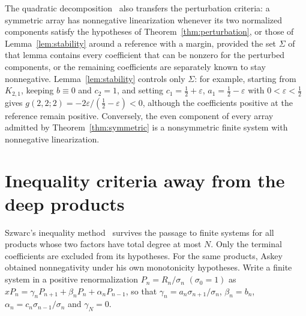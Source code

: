 The quadratic decomposition~\cite[Theorem~]{P1} also transfers the perturbation criteria: a symmetric array has nonnegative linearization whenever its two normalized components satisfy the hypotheses of Theorem~\ref{thm:perturbation}, or those of Lemma~\ref{lem:stability} around a reference with a margin, provided the set $\Sigma$ of that lemma contains every coefficient that can be nonzero for the perturbed components, or the remaining coefficients are separately known to stay nonnegative. Lemma~\ref{lem:stability} controls only $\Sigma$: for example, starting from $K_{2,1}$, keeping $b\equiv0$ and $c_2=1$, and setting $c_1=\tfrac12+\varepsilon$, $a_1=\tfrac12-\varepsilon$ with $0<\varepsilon<\tfrac12$ gives $g(2,2;2)=-2\varepsilon/(\tfrac12-\varepsilon)<0$, although the coefficients positive at the reference remain positive. Conversely, the even component of every array admitted by Theorem~\ref{thm:symmetric} is a nonsymmetric finite system with nonnegative linearization.

\section{Inequality criteria away from the deep products}\label{sec:low}
Szwarc's inequality method~\cite[Theorems~3.2 and~3.4]{szwarc} survives the passage to finite systems for all products whose two factors have total degree at most $N$. Only the terminal coefficients are excluded from its hypotheses. For the same products, Askey~\cite[Part~II, Corollary~1]{askey} obtained nonnegativity under his own monotonicity hypotheses. Write a finite system in a positive renormalization $P_n=R_n/\sigma_n$ $(\sigma_0=1)$ as $xP_n=\gamma_nP_{n+1}+\beta_nP_n+\alpha_nP_{n-1}$, so that $\gamma_n=a_n\sigma_{n+1}/\sigma_n$, $\beta_n=b_n$, $\alpha_n=c_n\sigma_{n-1}/\sigma_n$ and $\gamma_N=0$.


